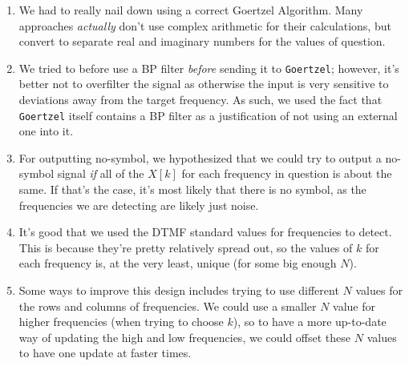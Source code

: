 \documentclass[12pt]{article}
\begin{document}
\begin{enumerate}
    \item We had to really nail down using a correct Goertzel Algorithm. 
    Many approaches \textit{actually} don't use complex arithmetic 
    for their calculations, but convert to separate real and 
    imaginary numbers for the values of question.
    \item We tried to before use a BP filter \textit{before} sending it 
    to \texttt{Goertzel}; however, it's better not to overfilter 
    the signal as otherwise the input is very sensitive to deviations 
    away from the target frequency. As such, we used the fact that 
    \texttt{Goertzel} itself contains a BP filter as a justification of 
    not using an external one into it. 
    \item For outputting no-symbol, we hypothesized that we could 
    try to output a no-symbol signal \textit{if} all of the $X[k]$ for 
    each frequency in question is about the same. If that's the case, it's 
    most likely that there is no symbol, as the frequencies we are detecting 
    are likely just noise. 
    \item It's good that we used the DTMF standard values for frequencies to 
    detect. This is because they're pretty relatively spread out, so 
    the values of $k$ for each frequency is, at the very least, unique (for some 
    big enough $N$).
    \item Some ways to improve this design includes trying to use different $N$ 
    values for the rows and columns of frequencies. We could use a smaller $N$ 
    value for higher frequencies (when trying to choose $k$), so to have 
    a more up-to-date way of updating the high and low frequencies, we could 
    offset these $N$ values to have one update at faster times. 
\end{enumerate}
    
\end{document}
